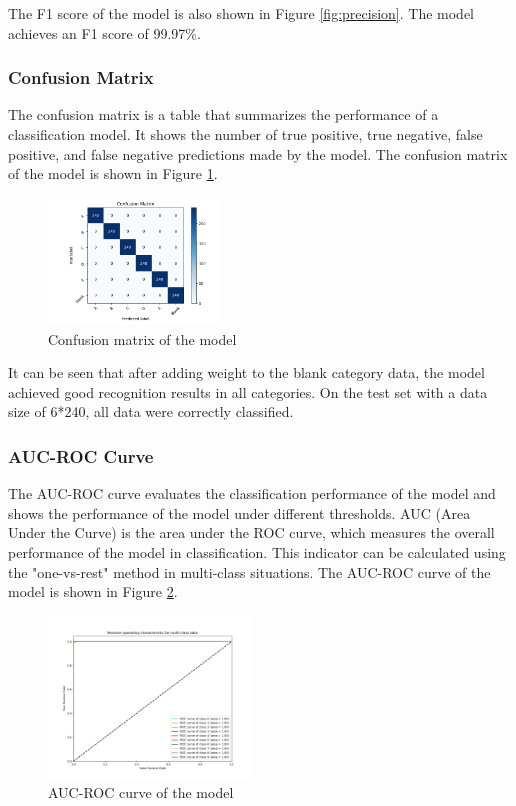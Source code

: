 \documentclass[twocolumn]{article}
\begin{document}
    The F1 score of the model is also shown in Figure \ref{fig:precision}. The model achieves an F1 score of 99.97\%.

    \subsubsection{Confusion Matrix}
    The confusion matrix is a table that summarizes the performance of a classification model. It shows the number of true positive, true negative, false positive, and false negative predictions made by the model. The confusion matrix of the model is shown in Figure \ref{fig:confusion_matrix}.

    \begin{figure}[ht]
        \centering
        \includegraphics[width=0.4\textwidth]{confusion_matrix.png}
        \caption{Confusion matrix of the model}
        \label{fig:confusion_matrix}
    \end{figure}

    It can be seen that after adding weight to the blank category data, the model achieved good recognition results in all categories. On the test set with a data size of 6*240, all data were correctly classified.

    \subsubsection{AUC-ROC Curve}
    The AUC-ROC curve evaluates the classification performance of the model and shows the performance of the model under different thresholds. AUC (Area Under the Curve) is the area under the ROC curve, which measures the overall performance of the model in classification. This indicator can be calculated using the "one-vs-rest" method in multi-class situations. The AUC-ROC curve of the model is shown in Figure \ref{fig:auc_roc}.

    \begin{figure}[ht]
        \centering
        \includegraphics[width=0.48\textwidth]{auc_roc.png}
        \caption{AUC-ROC curve of the model}
        \label{fig:auc_roc}
    \end{figure}
\end{document}
